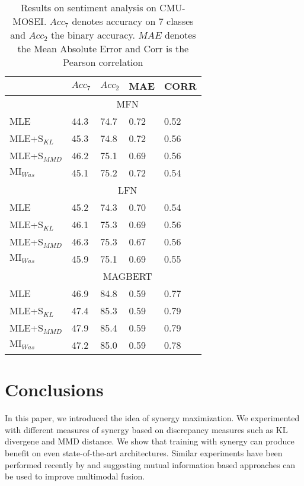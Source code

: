 \documentclass[letterpaper]{article} %
\begin{document}
\begin{table}[htb]
\begin{tabular}{|l|llll|}
\hline
   &  $Acc_{7}$   & $Acc_{2}$   & MAE  & CORR \\
\hline
\hline
   & & \multicolumn{2}{c}{MFN} & \\
\hline
MLE &  44.3 & 74.7 & 0.72 & 0.52 \\
MLE+$\text{S}_{KL}$ &  45.3 & 74.8 & 0.72 & 0.56 \\
MLE+$\text{S}_{MMD}$ &  46.2 & 75.1 & 0.69 & 0.56 \\
$\text{MI}_{Was}$ &  45.1 & 75.2 & 0.72 & 0.54 \\
\hline
   & & \multicolumn{2}{c}{LFN} & \\
\hline
MLE &  45.2 & 74.3 & 0.70 & 0.54 \\
MLE+$\text{S}_{KL}$ &  46.1 & 75.3 & 0.69 & 0.56 \\
MLE+$\text{S}_{MMD}$ &  46.3 & 75.3 & 0.67 & 0.56 \\
$\text{MI}_{Was}$ &  45.9 & 75.1 & 0.69 & 0.55 \\
\hline
   & & \multicolumn{2}{c}{MAGBERT} & \\
\hline
MLE &  46.9 & 84.8 & 0.59 & 0.77 \\
MLE+$\text{S}_{KL}$ &  47.4 & 85.3 & 0.59 & 0.79 \\
MLE+$\text{S}_{MMD}$ &  47.9 & 85.4 & 0.59 & 0.79 \\
$\text{MI}_{Was}$ &  47.2 & 85.0 & 0.59 & 0.78 \\
\hline
\end{tabular}
\caption{Results on sentiment analysis on CMU-MOSEI. $Acc_{7}$ denotes accuracy on 7 classes and $Acc_{2}$ the binary accuracy. $MAE$ denotes the Mean Absolute Error and Corr is the Pearson correlation \label{tab:mosei}}
\end{table}



\section{Conclusions}
In this paper, we introduced the idea of synergy maximization. We experimented with different measures of synergy based on discrepancy measures such as KL divergene and MMD distance. We show that training with synergy can produce benefit on even state-of-the-art architectures. Similar experiments have been performed recently by \citet{han2021improving} and \citet{colombo2021improving} suggesting mutual information based approaches can be used to improve multimodal fusion.



%

 
%



\end{document}
